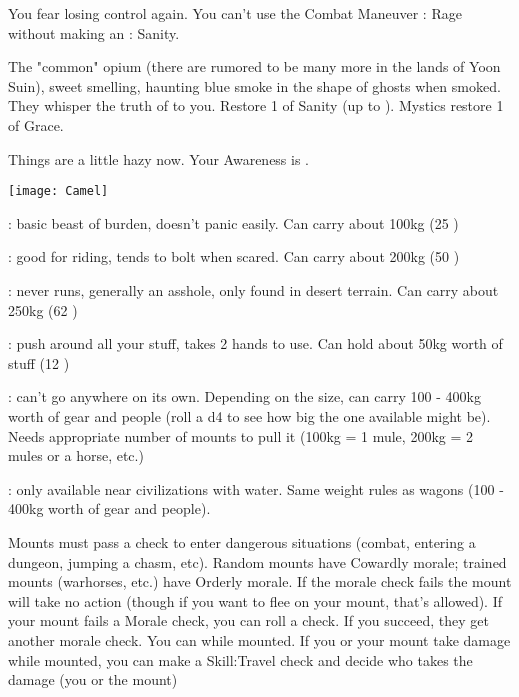 {\begin{multicols}{2}
    You fear losing control again.  You can't use the Combat Maneuver : Rage without making an \RS : Sanity.

\cbreak


  The "common" opium (there are rumored to be many more in the lands of Yoon Suin), sweet smelling, haunting blue smoke in the shape of ghosts when smoked.  They whisper the truth of \TheAuthority to you.  Restore 1 \UD of Sanity (up to \MAX).  Mystics restore 1 \UD of Grace.

    Things are a little hazy now.  Your \MAX Awareness is \DCDOWN.

  \newpage


 

  \begin{center}
  \texttt{[image: Camel]}
  \end{center}

   
  : basic beast of burden, doesn't panic easily.  Can carry about 100kg (25 )

  :   good for riding, tends to bolt when scared.  Can carry about 200kg (50 )

  :  never runs, generally an asshole, only found in desert terrain.  Can carry about 250kg (62 )

  :  push around all your stuff, takes 2 hands to use.  Can hold about 50kg worth of stuff (12 )

  :  can't go anywhere on its own.  Depending on the size, can carry 100 - 400kg worth of gear and people (roll a d4 to see how big the one available might be).  Needs appropriate number of mounts to pull it (100kg = 1 mule, 200kg = 2 mules or a horse, etc.)

  :  only available near civilizations with water.  Same weight rules as wagons (100 - 400kg worth of gear and people).

\cbreak      

    
    Mounts must pass a  check to enter dangerous situations (combat, entering a dungeon, jumping a chasm, etc). Random mounts have Cowardly morale; trained mounts (warhorses, etc.) have Orderly morale.  If the morale check fails the mount will take no action (though if you want to flee on your mount, that's allowed). If your mount fails a Morale check, you can roll a  check.  If you succeed, they get another morale check. You can  while mounted.  If you or your mount take damage while mounted, you can make a Skill:Travel check and decide who takes the damage (you or the mount)



\end{multicols}}
